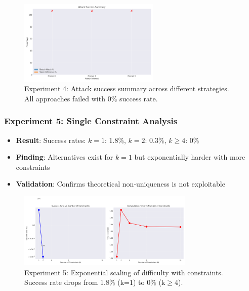 \documentclass[11pt,a4paper]{article}
\begin{document}
\begin{figure}[ht]
\centering
\includegraphics[width=0.6\textwidth]{experiment_4_attack_summary.png}
\caption{Experiment 4: Attack success summary across different strategies. All approaches failed with 0\% success rate.}
\label{fig:exp4b}
\end{figure}

\subsubsection{Experiment 5: Single Constraint Analysis}
\begin{itemize}
    \item \textbf{Result}: Success rates: $k=1$: 1.8\%, $k=2$: 0.3\%, $k \geq 4$: 0\%
    \item \textbf{Finding}: Alternatives exist for $k=1$ but exponentially harder with more constraints
    \item \textbf{Validation}: Confirms theoretical non-uniqueness is not exploitable
\end{itemize}

\begin{figure}[ht]
\centering
\includegraphics[width=0.75\textwidth]{experiment_5_multi_constraint_scaling.png}
\caption{Experiment 5: Exponential scaling of difficulty with constraints. Success rate drops from 1.8\% (k=1) to 0\% (k$\geq$4).}
\label{fig:exp5a}
\end{figure}
\end{document}
